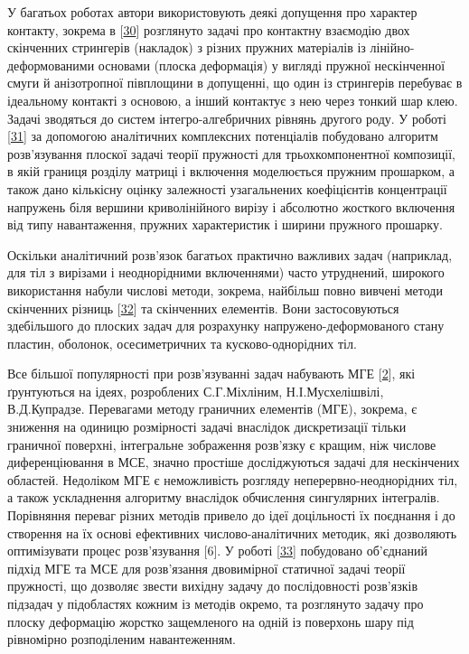 У багатьох роботах автори використовують деякі допущення про характер
контакту, зокрема в {[}\protect\hyperlink{anchor-18}{30}{]} розглянуто
задачі про контактну взаємодію двох скінченних стрингерів (накладок) з
різних пружних матеріалів із лінійно-деформованими основами (плоска
деформація) у вигляді пружної нескінченної смуги й анізотропної
півплощини в допущенні, що один із стрингерів перебуває в ідеальному
контакті з основою, а інший контактує з нею через тонкий шар клею.
Задачі зводяться до систем інтегро-алгебричних рівнянь другого роду. У
роботі {[}\protect\hyperlink{anchor-19}{31}{]} за допомогою аналітичних
комплекс­них потенціалів побудовано алгоритм розв'язування плоскої
задачі теорії пружності для трьохкомпонентної композиції, в якій границя
розділу матриці і включення моделюється пружним прошарком, а також дано
кількісну оцінку залежності узагальнених коефіцієнтів концентрації
напружень біля вершини криволі­нійного вирізу і абсолютно жосткого
включення від типу навантаження, пружних характеристик і ширини пружного
прошарку.

Оскільки аналітичний розв'язок багатьох практично важливих задач
(наприклад, для тіл з вирізами і неоднорідними включеннями) часто
утруднений, широкого використання набули числові методи, зокрема,
найбільш повно вивчені методи скінченних різниць
{[}\protect\hyperlink{anchor-20}{32}{]} та скінченних елементів. Вони
застосовуються здебільшого до плоских задач для розрахунку
напружено-деформованого стану пластин, оболонок, осесиметричних та
кусково-однорідних тіл.

Все більшої популярності при розв'язуванні задач набувають МГЕ
{[}\protect\hyperlink{anchor-2}{2}{]}, які ґрунтуються на ідеях,
розроблених С.Г.Міхліним, Н.І.Мусхелішвілі, В.Д.Купрадзе. Перевагами
методу граничних елементів (МГЕ), зокрема, є зниження на одиницю
розмірності задачі внаслідок дискретизації тільки граничної поверхні,
інтегральне зображення розв'язку є кращим, ніж числове диференціювання в
МСЕ, значно простіше досліджуються задачі для нескінчених областей.
Недоліком МГЕ є неможливість розгляду неперервно-неоднорідних тіл, а
також ускладнення алгоритму внаслідок обчислення сингулярних інтегралів.
Порівняння переваг різних методів привело до ідеї доцільності їх
поєднання і до створення на їх основі ефективних числово-аналітичних
методик, які дозволяють оптимізувати процес розв'язування {[}6{]}. У
роботі {[}\protect\hyperlink{anchor-21}{33}{]} побудовано об'єднаний
підхід МГЕ та МСЕ для розв'язання двовимірної статичної задачі теорії
пружності, що дозволяє звести вихідну задачу до послідовності розв'язків
підзадач у підобластях кожним із методів окремо, та розглянуто задачу
про плоску деформацію жорстко защемленого на одній із поверхонь шару під
рівномірно розподіленим навантеженням.

